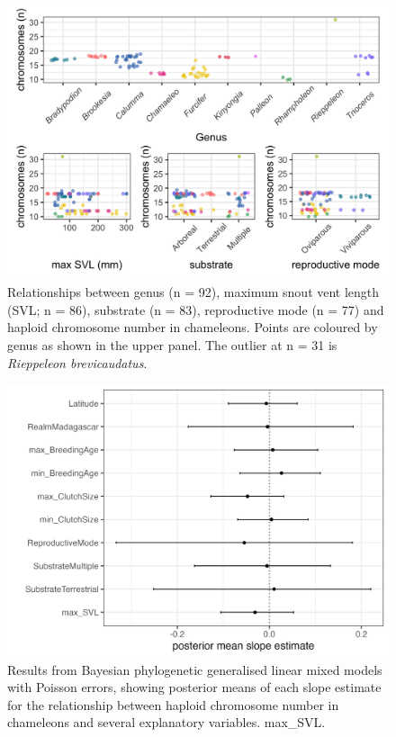 \documentclass[a4paper, 12pt]{article}
\begin{document}


\begin{figure}[H]
 \centering
  \includegraphics[width = \linewidth]{figures/ecology-genus-svl.png}
  \caption{Relationships between genus (n = 92), maximum snout vent length (SVL; n = 86), substrate (n = 83), reproductive mode (n = 77) and haploid chromosome number in chameleons. Points are coloured by genus as shown in the upper panel. The outlier at n = 31 is \textit{Rieppeleon brevicaudatus}.
}
  \label{fig-ecology1}
\end{figure} 

\newpage
\begin{figure}[H]
 \centering
  \includegraphics[width = \linewidth]{figures/mcmcglmm-figure.png}
  \caption{Results from Bayesian phylogenetic generalised linear mixed models with Poisson errors, showing posterior means of each slope estimate for the relationship between haploid chromosome number in chameleons and several explanatory variables. max\_SVL.
}
  \label{fig-ecology2}
\end{figure}
\end{document}
